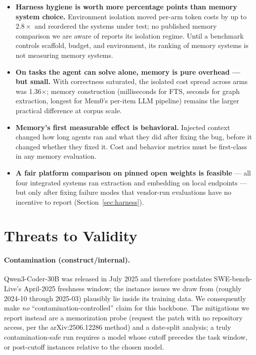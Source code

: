 \documentclass[11pt]{article}
\begin{document}
\begin{itemize}
  \item \textbf{Harness hygiene is worth more percentage points than memory system choice.} Environment isolation moved per-arm token costs by up to $2.8\times$ and reordered the systems under test; no published memory comparison we are aware of reports its isolation regime. Until a benchmark controls scaffold, budget, and environment, its ranking of memory systems is not measuring memory systems.
  \item \textbf{On tasks the agent can solve alone, memory is pure overhead --- but small.} With correctness saturated, the isolated cost spread across arms was 1.36$\times$; memory construction (milliseconds for FTS, seconds for graph extraction, longest for Mem0's per-item LLM pipeline) remains the larger practical difference at corpus scale.
  \item \textbf{Memory's first measurable effect is behavioral.} Injected context changed how long agents ran and what they did after fixing the bug, before it changed whether they fixed it. Cost and behavior metrics must be first-class in any memory evaluation.
  \item \textbf{A fair platform comparison on pinned open weights is feasible} --- all four integrated systems ran extraction and embedding on local endpoints --- but only after fixing failure modes that vendor-run evaluations have no incentive to report (Section~\ref{sec:harness}).
\end{itemize}

\section{Threats to Validity}
\label{sec:threats}

\paragraph{Contamination (construct/internal).} Qwen3-Coder-30B was released in July 2025 and therefore postdates SWE-bench-Live's April-2025 freshness window; the instance issues we draw from (roughly 2024-10 through 2025-03) plausibly lie inside its training data. We consequently make \emph{no} ``contamination-controlled'' claim for this backbone. The mitigations we report instead are a memorization probe (request the patch with no repository access, per the arXiv:2506.12286 method) and a date-split analysis; a truly contamination-safe run requires a model whose cutoff precedes the task window, or post-cutoff instances relative to the chosen model.
\end{document}
